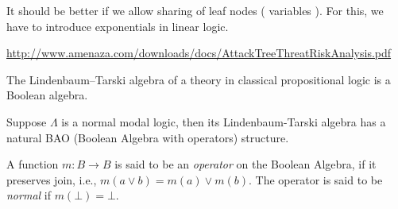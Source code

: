 It should be better if we allow sharing of leaf nodes ( variables ). 
 For this, we have to introduce exponentials in linear logic. 

\url{http://www.amenaza.com/downloads/docs/AttackTreeThreatRiskAnalysis.pdf}



The Lindenbaum–Tarski algebra of a theory in classical propositional logic is a Boolean algebra.

Suppose $\Lambda$ is a normal modal logic, 
then its Lindenbaum-Tarski algebra has a natural BAO (Boolean Algebra with operators) structure.

A function $m : B \rightarrow B$ is said to be an {\it operator}
on the Boolean Algebra, if it preserves join, i.e., 
$m ( a \vee b) = m (a) \vee m (b)$. 
%
The operator is said to be {\it normal} if $m(\bot) = \bot$. 